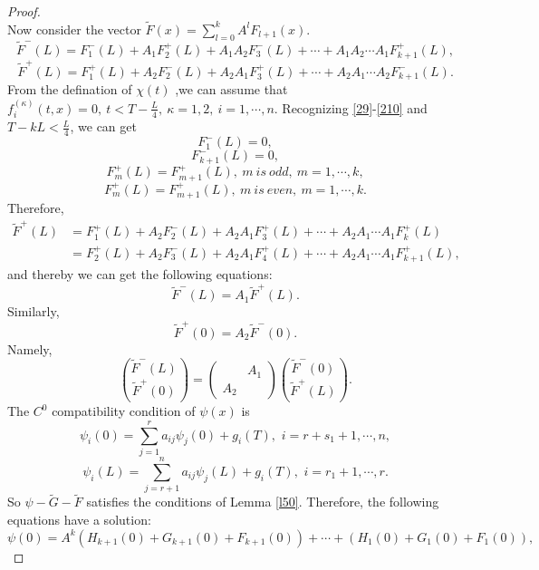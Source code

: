 \documentclass[a4paper,reqno,11pt]{amsart}
\numberwithin{equation}{section} %
\begin{document}
\begin{proof}
\begin{equation}
\end{equation}
Now consider the vector $\tilde{F}  (x) = \sum_{l=0}^k A^l F _{l+1}(x)$.
$$
\tilde{F}^-  (L) =F^- _1 (L) +A_1 F^+ _2 (L) +A_1 A_2 F^- _3 (L)  +\cdots +A_1 A_2 \cdots A_1 F^+ _{k+1} (L) ,
$$
$$
\tilde{F}^+  (L) =F^+ _1 (L) +A_2 F^- _2 (L) +A_2 A_1 F^+ _3 (L)  +\cdots +A_2 A_1 \cdots A_2 F^- _{k+1} (L) .
$$
From the defination of $\chi (t)$ ,we can assume that $f^{(\kappa)}_i(t,x)=0,\ t < T-\frac{L}{4},\ \kappa=1,2,\ i=1,\cdots,n$. Recognizing \eqref{29}-\eqref{210} and $T-kL < \frac{L}{4}$, we can get 
$$
F^- _{1}(L)=0,
$$
$$
F^- _{k+1}(L)=0,
$$
$$
F^+ _{m}(L) =F^+ _{m+1}(L) ,\ m\ is\ odd ,\ m=1,\cdots ,k,
$$
$$
F^+ _{m}(L) =F^+ _{m+1}(L) ,\ m\ is\ even ,\ m=1,\cdots ,k.
$$
Therefore,
\begin{equation}
	\begin{aligned}
		\tilde{F}^+  (L) &=F^+ _1 (L) +A_2 F^- _2 (L) +A_2 A_1 F^+ _3 (L)  +\cdots +A_2 A_1 \cdots A_1 F^+ _{k} (L) \\
		                 &=F^+ _2 (L) +A_2 F^- _3 (L) +A_2 A_1 F^+ _4 (L)  +\cdots +A_2 A_1 \cdots A_1 F^+ _{k+1} (L) ,
	\end{aligned}
\end{equation}
and thereby we can get the following equations:
$$
\tilde{F}^-  (L) =A_1 \tilde{F} ^+  (L) .
$$
Similarly,
$$
\tilde{F}^+  (0) =A_2 \tilde{F} ^-  (0) .
$$
Namely, 
\begin{equation}\label{compatibility condition of F}
    \binom{\tilde{F} ^{-}(L)}{\tilde{F}^{+}(0)}=\left(\begin{array}{ll} 
        & A_1 \\
        A_2 &
    \end{array}\right)\binom{\tilde{F}^{-}(0)}{\tilde{F} ^{+}(L)}.
\end{equation}
The $C^0$ compatibility condition of $\psi(x)$ is
\begin{equation}\label{21}
    \psi _i\left( 0 \right) =\sum_{j=1}^r{a_{ij}\psi _j\left( 0 \right) + g_i(T),\,\,i=r+s_1+1,\cdots ,n},
\end{equation}
\begin{equation}\label{22}
    \psi _i\left( L \right) =\sum_{j=r+1}^n{a_{ij}\psi _j\left( L \right) +g_i(T),\,\,i=r_1+1,\cdots ,r}.
\end{equation}
So $\psi -\tilde{G} -\tilde{F} $ satisfies the conditions of Lemma \ref{l50}. Therefore, the following equations have a solution:
\begin{equation}\label{c0 continuity at 0}
\psi\left( 0 \right) =A^k\left( H_{k+1}\left( 0 \right) +G_{k+1}\left( 0 \right)+F_{k+1}\left( 0 \right) \right)  +\cdots +\left( H_1\left( 0 \right) +G_1\left( 0 \right)+F_1\left( 0 \right) \right) ,

\end{equation}
\end{proof}
\end{document}
